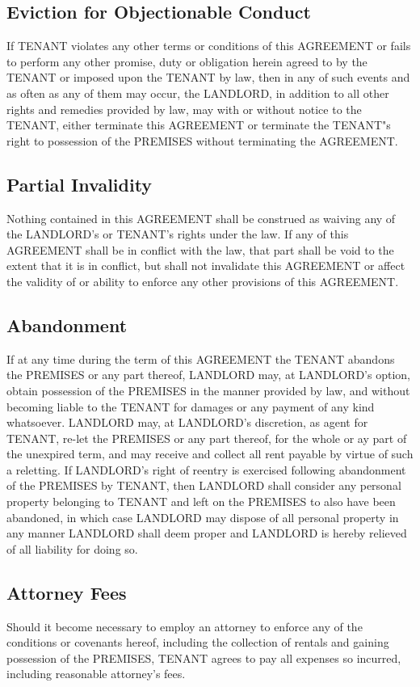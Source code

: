 \documentclass[11pt]{article}
\begin{document}
\subsection*{Eviction for Objectionable Conduct}
\label{sec:orga38cb4c}
If TENANT violates any other terms or conditions of this AGREEMENT or
fails to perform any other promise, duty or obligation herein agreed
to by the TENANT or imposed upon the TENANT by law, then in any of
such events and as often as any of them may occur, the LANDLORD, in
addition to all other rights and remedies provided by law, may with or
without notice to the TENANT, either terminate this AGREEMENT or
terminate the TENANT"s right to possession of the PREMISES without
terminating the AGREEMENT.

\subsection*{Partial Invalidity}
\label{sec:org4342250}
Nothing contained in this AGREEMENT shall be construed as waiving any
of the LANDLORD's or TENANT's rights under the law.  If any of this
AGREEMENT shall be in conflict with the law, that part shall be void
to the extent that it is in conflict, but shall not invalidate this
AGREEMENT or affect the validity of or ability to enforce any other
provisions of this AGREEMENT.

\subsection*{Abandonment}
\label{sec:orgf449144}
If at any time during the term of this AGREEMENT the TENANT abandons
the PREMISES or any part thereof, LANDLORD may, at LANDLORD's option,
obtain possession of the PREMISES in the manner provided by law, and
without becoming liable to the TENANT for damages or any payment of any
kind whatsoever.  LANDLORD may, at LANDLORD's discretion, as agent for
TENANT, re-let the PREMISES or any part thereof, for the whole or ay
part of the unexpired term, and may receive and collect all rent
payable by virtue of such a reletting.  If LANDLORD's right of reentry
is exercised following abandonment of the PREMISES by TENANT, then
LANDLORD shall consider any personal property belonging to TENANT and
left on the PREMISES to also have been abandoned, in which case
LANDLORD may dispose of all personal property in any manner LANDLORD
shall deem proper and LANDLORD is hereby relieved of all liability for
doing so.

\subsection*{Attorney Fees}
\label{sec:orgdc61b48}
Should it become necessary to employ an attorney to enforce any of the
conditions or covenants hereof, including the collection of rentals
and gaining possession of the PREMISES, TENANT agrees to pay all
expenses so incurred, including reasonable attorney's fees.
\end{document}
